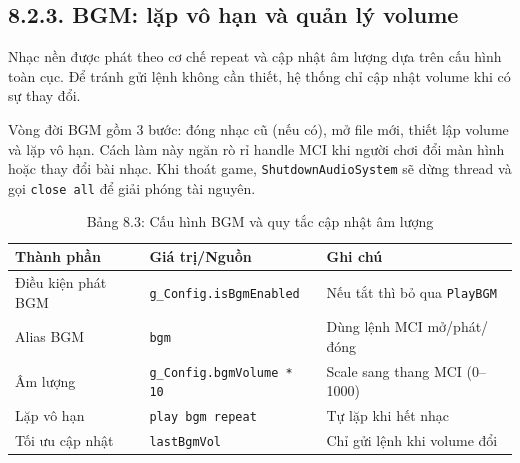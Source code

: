 \subsection*{8.2.3. BGM: lặp vô hạn và quản lý volume}

\setlength{\parindent}{1.5em} Nhạc nền được phát theo cơ chế repeat và cập nhật âm lượng dựa trên cấu hình toàn cục. Để tránh gửi lệnh không cần thiết, hệ thống chỉ cập nhật volume khi có sự thay đổi.

\setlength{\parindent}{1.5em} Vòng đời BGM gồm 3 bước: đóng nhạc cũ (nếu có), mở file mới, thiết lập volume và lặp vô hạn. Cách làm này ngăn rò rỉ handle MCI khi người chơi đổi màn hình hoặc thay đổi bài nhạc. Khi thoát game, \texttt{ShutdownAudioSystem} sẽ dừng thread và gọi \texttt{close all} để giải phóng tài nguyên.

\begin{table}[H]
\caption*{Bảng 8.3: Cấu hình BGM và quy tắc cập nhật âm lượng}
\label{tbl:ch8_bgm_config}
\centering
\renewcommand{\arraystretch}{0.9}
\begin{tabularx}{\linewidth}{|L{3.3cm}|L{5.4cm}|X|}
\hline
\textbf{Thành phần} & \textbf{Giá trị/Nguồn} & \textbf{Ghi chú} \\ \hline
Điều kiện phát BGM & \texttt{g\_Config.isBgmEnabled} & Nếu tắt thì bỏ qua \texttt{PlayBGM} \\ \hline
Alias BGM & \texttt{bgm} & Dùng lệnh MCI mở/phát/đóng \\ \hline
Âm lượng & \texttt{g\_Config.bgmVolume * 10} & Scale sang thang MCI (0--1000) \\ \hline
Lặp vô hạn & \texttt{play bgm repeat} & Tự lặp khi hết nhạc \\ \hline
Tối ưu cập nhật & \texttt{lastBgmVol} & Chỉ gửi lệnh khi volume đổi \\ \hline
\end{tabularx}
\end{table}

